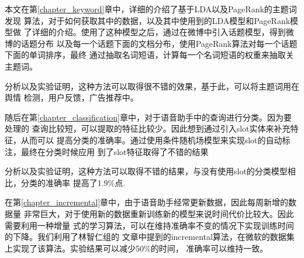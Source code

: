 \documentclass[master]{njuthesis}
\begin{document}
本文在第\ref{chapter_keyword}章中，详细的介绍了基于LDA以及PageRank的主题词发现
算法，对于如何获取其中的数据，以及其中使用到的LDA模型和PageRank模型做
了详细的介绍。使用了这种模型之后，通过在微博中引入话题模型，得到微博的话题分布
以及每一个话题下面的文档分布，使用PageRank算法对每一个话题下面的单词排序，最终
通过抽取名词短语，计算每一个名词短语的权重来抽取关主题词。

分析以及实验证明，这种方法可以取得很不错的效果，基于此，可以将主题词用在舆情
检测，用户反馈，广告推荐中。

随后在第\ref{chapter_classification}章中，对于语音助手中的查询进行分类。因为要处理的
查询比较短，可以提取的特征比较少。因此想到通过引入slot实体来补充特征，从而可以
提高分类的准确率。通过使用条件随机场模型来实现slot的自动标注，最终在分类时候应用
到了slot特征取得了不错的结果

分析以及实验证明，这种方法可以取得不错的结果，与没有使用slot的分类模型相比，分类的准确率
提高了1.9\%点.


在第\ref{chapter_incremental}章中，由于语音助手经常更新数据，因此每周新增的数据量
非常巨大，对于使用新的数据重新训练新的模型来说时间代价比较大。因此需要利用一种增量
式的学习算法，可以在维持准确率不变的情况下实现训练时间的下降。我们利用了林智仁组的
文章中提到的incremental算法，在微软的数据集上实现了该算法。实验结果可以减少50\%的时间，
准确率可以维持一致。
\end{document}

